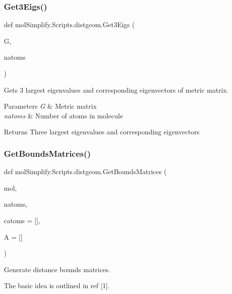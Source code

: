 \subsubsection{\texorpdfstring{Get3\+Eigs()}{Get3Eigs()}}
{\footnotesize\ttfamily def mol\+Simplify.\+Scripts.\+distgeom.\+Get3\+Eigs (\begin{DoxyParamCaption}\item[{}]{G,  }\item[{}]{natoms }\end{DoxyParamCaption})}



Gets 3 largest eigenvalues and corresponding eigenvectors of metric matrix. 


\begin{DoxyParams}{Parameters}
{\em G} & Metric matrix \\
\hline
{\em natoms} & Number of atoms in molecule \\
\hline
\end{DoxyParams}
\begin{DoxyReturn}{Returns}
Three largest eigenvalues and corresponding eigenvectors 
\end{DoxyReturn}
\mbox{\label{namespacemolSimplify_1_1Scripts_1_1distgeom_a511e618a1e62d7d1ad97e26692c62a42}} 
\subsubsection{\texorpdfstring{Get\+Bounds\+Matrices()}{GetBoundsMatrices()}}
{\footnotesize\ttfamily def mol\+Simplify.\+Scripts.\+distgeom.\+Get\+Bounds\+Matrices (\begin{DoxyParamCaption}\item[{}]{mol,  }\item[{}]{natoms,  }\item[{}]{catoms = {\ttfamily \mbox{[}\mbox{]}},  }\item[{}]{A = {\ttfamily \mbox{[}\mbox{]}} }\end{DoxyParamCaption})}



Generate distance bounds matrices. 

The basic idea is outlined in ref \mbox{[}1\mbox{]}.

